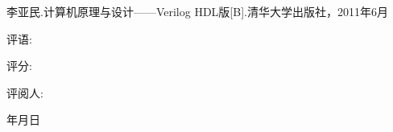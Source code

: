\documentclass[forprint]{cpu}
\begin{document}


\cleardoublepage{}
{}
\renewcommand{\baselinestretch}{1.6}
\begin{thebibliography}{00}


   李亚民.计算机原理与设计——Verilog HDL版[B].清华大学出版社，2011年6月



\end{thebibliography}





\appendix
\begin{teacher}
\thispagestyle{empty}
评语: 
\par
\vspace*{12.5cm}
\hspace*{7.5cm}评分: 
\vspace*{1cm}

\hspace*{7.3cm}评阅人:

\vspace*{0.5cm}

\hspace*{10.1cm}年\hspace*{1cm}月\hspace*{1cm}日

\vspace*{0.5cm}

{\songti {} }

\end{teacher}


\cleardoublepage
\end{document}
